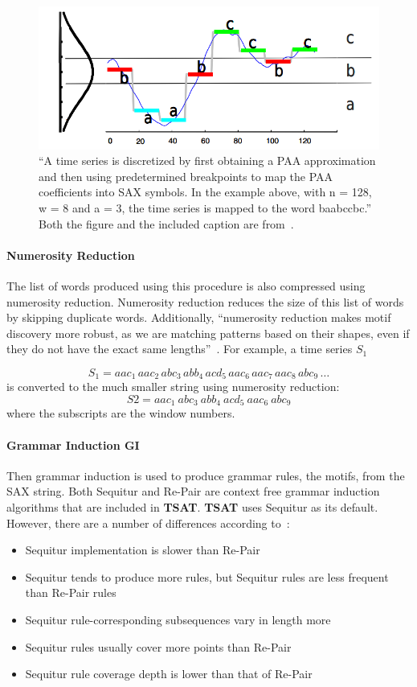 \documentclass[letterpaper, 12pt]{article}
\newcommand\TSAT{\textbf{TSAT}}
\begin{document}
\begin{figure}[H]
	\centering
	\includegraphics[width=.7\textwidth]{pictures/TSAT-SAX}
	\caption{``A time series is discretized by first obtaining a PAA approximation and then using predetermined breakpoints to map the PAA coefficients into SAX symbols. In the example above, with n = 128, w = 8 and a = 3, the time series is mapped to the word baabccbc.''  Both the figure and the included caption are from~\cite{lin2007experiencing}.}
	\label{fig:tsat-sax}
\end{figure}


\paragraph{Numerosity Reduction}The list of words produced using this procedure is also compressed using numerosity reduction.  Numerosity reduction reduces the size of this list of words by skipping duplicate words.  Additionally, ``numerosity reduction makes motif discovery more robust, as we are matching patterns based on their shapes, even if they do not have the exact same lengths''~\cite{li2012visualizing}.  For example, a time series \(S_{1}\) 

\[
S_{1}= aac_{1}\, aac_{2}\, abc_{3}\, abb_{4}\, acd_{5}\, aac_{6}\, aac_{7}\, aac_{8}\, abc_{9}\, \dots
\]
is converted to the much smaller string using numerosity reduction:
\[S2 = \textit{aac}_{1}~ \textit{abc}_{3}~ \textit{abb}_{4}~ \textit{acd}_{5}~ \textit{aac}_{6}~ \textit{abc}_{9}\]
where the subscripts are the window numbers.

\paragraph{Grammar Induction GI}Then grammar induction is used to produce grammar rules, the motifs, from the SAX string. Both Sequitur and Re-Pair are context free grammar induction algorithms that are included in {\TSAT}.  {\TSAT} uses Sequitur as its default.  However, there are a number of differences according to~\cite{readmeGI}:
\begin{itemize}
	\item Sequitur implementation is slower than Re-Pair
	\item Sequitur tends to produce more rules, but Sequitur rules are less frequent than Re-Pair rules
	\item Sequitur rule-corresponding subsequences vary in length more
	\item Sequitur rules usually cover more points than Re-Pair
	\item Sequitur rule coverage depth is lower than that of Re-Pair
\end{itemize}
\end{document}
